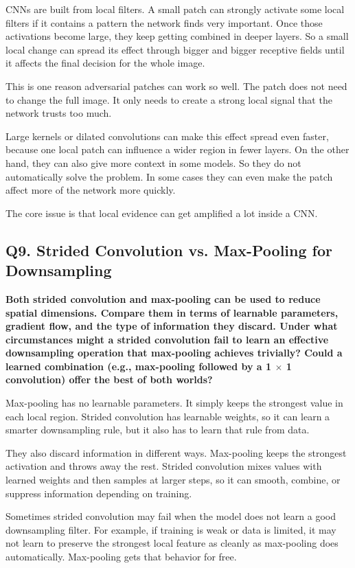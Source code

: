 \documentclass[12pt,a4paper]{article}
\newcommand{\qtext}[1]{\noindent\textbf{#1}\par}
\newcommand{\ansstart}{\begingroup\color{answerblue}}
\newcommand{\ansend}{\endgroup}
\begin{document}
\ansstart
CNNs are built from local filters. A small patch can strongly activate some local filters if it contains a pattern the network finds very important. Once those activations become large, they keep getting combined in deeper layers. So a small local change can spread its effect through bigger and bigger receptive fields until it affects the final decision for the whole image.

This is one reason adversarial patches can work so well. The patch does not need to change the full image. It only needs to create a strong local signal that the network trusts too much.

Large kernels or dilated convolutions can make this effect spread even faster, because one local patch can influence a wider region in fewer layers. On the other hand, they can also give more context in some models. So they do not automatically solve the problem. In some cases they can even make the patch affect more of the network more quickly.

The core issue is that local evidence can get amplified a lot inside a CNN.
\ansend

\clearpage

\subsection{Q9. Strided Convolution vs. Max-Pooling for Downsampling}

\qtext{Both strided convolution and max-pooling can be used to reduce spatial dimensions. Compare them in terms of learnable parameters, gradient flow, and the type of information they discard. Under what circumstances might a strided convolution fail to learn an effective downsampling operation that max-pooling achieves trivially? Could a learned combination (e.g., max-pooling followed by a 1 \(\times\) 1 convolution) offer the best of both worlds?}

\ansstart
Max-pooling has no learnable parameters. It simply keeps the strongest value in each local region. Strided convolution has learnable weights, so it can learn a smarter downsampling rule, but it also has to learn that rule from data.

They also discard information in different ways. Max-pooling keeps the strongest activation and throws away the rest. Strided convolution mixes values with learned weights and then samples at larger steps, so it can smooth, combine, or suppress information depending on training.

Sometimes strided convolution may fail when the model does not learn a good downsampling filter. For example, if training is weak or data is limited, it may not learn to preserve the strongest local feature as cleanly as max-pooling does automatically. Max-pooling gets that behavior for free.
\end{document}

